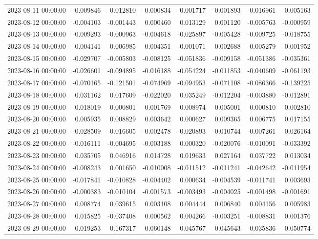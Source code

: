 \begin{tabular}{lrrrrrrr}
2023-08-11 00:00:00 & -0.009846 & -0.012810 & -0.000834 & -0.001717 & -0.001893 & -0.016961 & 0.005163 \\
2023-08-12 00:00:00 & -0.004103 & -0.001443 & 0.000460 & 0.013129 & 0.001120 & -0.005763 & -0.000959 \\
2023-08-13 00:00:00 & -0.009293 & -0.000963 & -0.004618 & -0.025897 & -0.005428 & -0.009725 & -0.018755 \\
2023-08-14 00:00:00 & 0.004141 & 0.006985 & 0.004351 & -0.001071 & 0.002688 & 0.005279 & 0.001952 \\
2023-08-15 00:00:00 & -0.029707 & -0.005803 & -0.008125 & -0.051836 & -0.009158 & -0.051386 & -0.035361 \\
2023-08-16 00:00:00 & -0.026601 & -0.094895 & -0.016188 & -0.054224 & -0.011853 & -0.040609 & -0.061193 \\
2023-08-17 00:00:00 & -0.070165 & -0.121501 & -0.074969 & -0.094953 & -0.071108 & -0.086366 & -0.139225 \\
2023-08-18 00:00:00 & 0.031162 & 0.017609 & -0.022020 & 0.035249 & -0.012204 & -0.003880 & -0.012891 \\
2023-08-19 00:00:00 & 0.018019 & -0.000801 & 0.001769 & 0.008974 & 0.005001 & 0.000810 & 0.002810 \\
2023-08-20 00:00:00 & 0.005935 & 0.008829 & 0.003642 & 0.000627 & 0.009365 & 0.006775 & 0.017155 \\
2023-08-21 00:00:00 & -0.028509 & -0.016605 & -0.002478 & -0.020893 & -0.010744 & -0.007261 & 0.026164 \\
2023-08-22 00:00:00 & -0.016111 & -0.004695 & -0.003188 & 0.000320 & -0.020076 & -0.010091 & -0.033392 \\
2023-08-23 00:00:00 & 0.035705 & 0.046916 & 0.014728 & 0.019633 & 0.027164 & 0.037722 & 0.013034 \\
2023-08-24 00:00:00 & -0.008243 & 0.001650 & -0.010008 & -0.011512 & -0.011241 & -0.042642 & -0.011954 \\
2023-08-25 00:00:00 & -0.017841 & -0.010828 & -0.004402 & 0.000634 & -0.004539 & -0.011741 & 0.003693 \\
2023-08-26 00:00:00 & -0.000383 & -0.010104 & -0.001573 & -0.003493 & -0.004025 & -0.001498 & -0.001691 \\
2023-08-27 00:00:00 & 0.008774 & 0.039615 & 0.003108 & 0.004444 & 0.006840 & 0.004156 & 0.005983 \\
2023-08-28 00:00:00 & 0.015825 & -0.037408 & 0.000562 & 0.004266 & -0.003251 & -0.008831 & 0.001376 \\
2023-08-29 00:00:00 & 0.019253 & 0.167317 & 0.060148 & 0.045767 & 0.045643 & 0.035836 & 0.050774 \\

\end{tabular}
